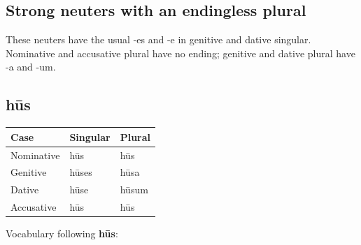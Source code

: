 \subsection*{Strong neuters with an endingless plural}

These neuters have the usual -es and -e in genitive and dative singular. Nominative and accusative plural have no ending; genitive and dative plural have -a and -um.

\subsection*{hūs}

\par\begingroup
\fontsize{10.5}{13.2}\selectfont
\setlength{\LTleft}{0pt}\setlength{\LTright}{\fill}
\noindent
\begin{tabular}{@{}>{\raggedright\arraybackslash}p{39.46mm}>{\raggedright\arraybackslash}p{39.46mm}>{\raggedright\arraybackslash}p{39.46mm}@{}}
\toprule
\textbf{Case} & \textbf{Singular} & \textbf{Plural} \\
\midrule
Nominative & hūs & hūs \\
Genitive & hūses & hūsa \\
Dative & hūse & hūsum \\
Accusative & hūs & hūs \\
\bottomrule
\end{tabular}
\par\endgroup

Vocabulary following \textbf{hūs}:

